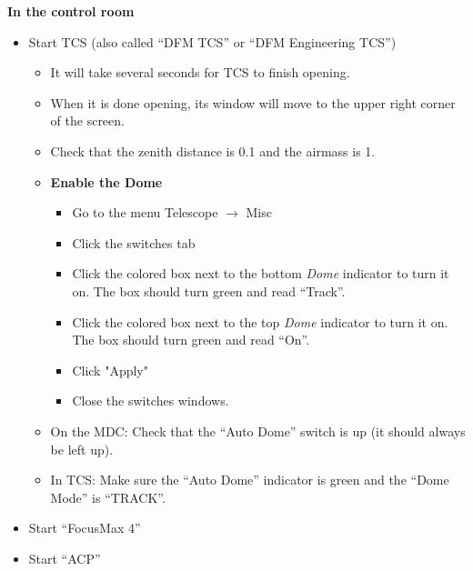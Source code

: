 \documentclass[letterpaper, 12pt]{report}
\begin{document}
\noindent
{\large\textbf{In the control room}}
\begin{itemize}
	\item Start TCS (also called ``DFM TCS'' or ``DFM Engineering TCS'')
	\begin{itemize}
		\item It will take several seconds for TCS to finish opening.
		\item When it is done opening, its window will move to the upper right corner of the screen.
		\item Check that the zenith distance is 0.1 and the airmass is 1.
		\item \textbf{Enable the Dome}
		\begin{itemize}
			\item Go to the menu Telescope $\rightarrow$ Misc
			\item Click the switches tab
			\item Click the colored box next to the bottom \emph{Dome} indicator to turn it on. The box should turn green and read ``Track''.
			\item Click the colored box next to the top \emph{Dome} indicator to turn it on. The box should turn green and read ``On''.
			\item Click "Apply"
			\item Close the switches windows.
		\end{itemize}
		\item On the MDC: Check that the ``Auto Dome'' switch is up (it should always be left up).
		\item In TCS: Make sure the ``Auto Dome'' indicator is green and the ``Dome Mode'' is ``TRACK''.
	\end{itemize}
	\item Start ``FocusMax 4''
	\item Start ``ACP''

\end{itemize}
\end{document}
